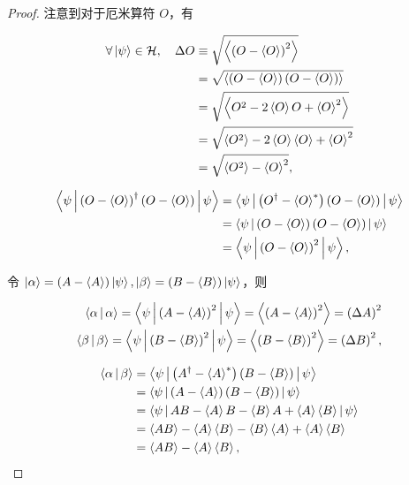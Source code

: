\begin{proof}

注意到对于厄米算符 $O $，有

\begin{equation}
\begin{split}
\forall \Ket{\psi}\in \mathcal{H},\quad
\Delta O
&\equiv \sqrt{\Braket{\left(O - \Braket{O} \right)^2}} \\
&=\sqrt{\Braket{ \left(O - \Braket{O} \right) \left(O - \Braket{O} \right) }} \\
&=\sqrt{\Braket{ O^2 - 2\Braket{O} O + \Braket{O}^2 }} \\
&=\sqrt{\Braket{O^2} - 2\Braket{O}\Braket{O} + \Braket{O}^2} \\
&=\sqrt{\Braket{O^2} -\Braket{O}^2},
\end{split}
\end{equation}

\begin{equation}
\begin{split}
\Braket{\psi | \left(O - \Braket{O} \right)^\dag \left(O - \Braket{O} \right) | \psi }
&=\Braket{\psi | \left(O^\dag - \Braket{O}^* \right) \left(O - \Braket{O} \right) | \psi } \\
&=\Braket{\psi | \left(O - \Braket{O} \right) \left(O - \Braket{O} \right) | \psi } \\
&=\Braket{\psi | \left(O - \Braket{O} \right)^2 | \psi },
\end{split}
\end{equation}

令 $\ket{\alpha} = \left(A - \Braket{A} \right) \ket{\psi},\ket{\beta} = \left(B - \Braket{B} \right) \ket{\psi} $，则

\begin{equation}
\begin{split}
\Braket{\alpha | \alpha }
=\Braket{\psi | \left(A - \Braket{A } \right)^2 | \psi }
=\Braket{\left(A - \Braket{A } \right)^2 }
=\left(\Delta A \right)^2 \\
\Braket{\beta | \beta }
=\Braket{\psi | \left(B - \Braket{B } \right)^2 | \psi }
=\Braket{\left(B - \Braket{B } \right)^2 }
=\left(\Delta B \right)^2,
\end{split}
\end{equation}

\begin{equation}
\begin{split}
\Braket{\alpha | \beta }
&=\Braket{\psi | \left(A^\dag-\Braket{A }^* \right) \left(B-\Braket{B } \right) | \psi } \\
&=\Braket{\psi | \left(A-\Braket{A } \right) \left(B-\Braket{B } \right) | \psi } \\
&=\Braket{\psi | AB - \Braket{A }B - \Braket{B }A + \Braket{A }\Braket{B } | \psi } \\
&=\Braket{AB } - \Braket{A }\Braket{B } - \Braket{B }\Braket{A } + \Braket{A }\Braket{B } \\
&=\Braket{AB } - \Braket{A }\Braket{B },
\end{split}
\end{equation}


\end{proof}
